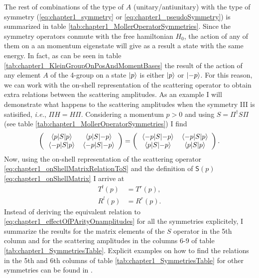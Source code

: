 %
The rest of combinations of the type of $A$ (unitary/antiunitary) with the type of symmetry (\eqref{eq:chapter1_symmetry} or \eqref{eq:chapter1_pseudoSymmetry}) is summarized in table \ref{tab:chapter1_MollerOperatorSymmetries}. Since the symmetry operators conmute with the free hamiltonian $H_0$, the action of any of them on a an momentum eigenstate will give as a result a state with the same energy. In fact, as can be seen in table \ref{tab:chapter1_KleinGroupOnPosAndMomentBases} the result of the action of any element $A$ of the 4-group on a state $\ket{p}$ is either $\ket{p}$ or $\ket{-p}$. For this reason, we can work with the on-shell representation of the scattering operator to obtain extra relations between the scattering amplitudes. As an example I will demonstrate what happens to the scattering amplitudes when the symmetry III is satisified, \textit{i.e.}, $\Pi H = H \Pi$. Considering a momentum $p>0$ and using $S = \Pi^{\dagger}S \Pi$ (see table \ref{tab:chapter1_MollerOperatorSymmetries}) I find
%
\begin{equation}
  \left(
  \begin{array}{cc}
    \mel{p}{S}{p} & \mel{p}{S}{-p}\\
    \mel{-p}{S}{p} & \mel{-p}{S}{-p}
  \end{array}
  \right)
  =
  \left(
  \begin{array}{cc}
    \mel{-p}{S}{-p} & \mel{-p}{S}{p}\\
    \mel{p}{S}{-p} & \mel{p}{S}{p}
  \end{array}
  \right).
\end{equation}
%
Now, using the on-shell representation of the scattering operator \eqref{eq:chapter1_onShellMatrixRelationToS} and the definition of $\mathsf{S}(p)$ \eqref{eq:chapter1_onShellMatrix} I arrive at
%
\begin{align}
  T^l(p) &= T^r(p),\nonumber\\
  R^l(p) &= R^r(p).
  \label{eq:chapter1_effectOfPArityOnamplitudes}
\end{align}
%
Instead of deriving the equivalent relation to \eqref{eq:chapter1_effectOfPArityOnamplitudes} for all the symmetries explicitely, I summarize the results for the matrix elements of the $S$ operator in the 5th column and for the scattering amplitudes in the columns 6-9 of table \ref{tab:chapter1_SymmetriesTable}. Explicit examples on how to find the relations in the 5th and 6th columns of table \ref{tab:chapter1_SymmetriesTable} for other symmetries can be found in \cite{Muga2004}.


